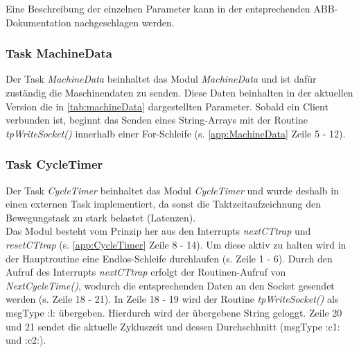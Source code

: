 Eine Beschreibung der einzelnen Parameter kann in der entsprechenden 
ABB-Dokumentation nachgeschlagen werden.



\subsubsection{Task MachineData}
Der Task \textit{MachineData} beinhaltet das Modul \textit{MachineData} und ist 
dafür zuständig die Maschinendaten zu senden. Diese Daten beinhalten in der 
aktuellen Version die in \ref{tab:machineData} dargestellten Parameter. Sobald 
ein Client verbunden ist, beginnt das Senden eines String-Arrays mit der 
Routine \textit{tpWriteSocket()} innerhalb einer For-Schleife (s. 
\ref{app:MachineData} Zeile 5 - 12).



\subsubsection{Task CycleTimer}
Der Task \textit{CycleTimer} beinhaltet das Modul \textit{CycleTimer} und wurde 
deshalb in einen externen Task implementiert, da sonst die Taktzeitaufzeichnung 
den Bewegungstask zu stark belastet (Latenzen).\\
Das Modul besteht vom Prinzip her aus den Interrupts \textit{nextCTtrap} und 
\textit{resetCTtrap} (s. \ref{app:CycleTimer} Zeile 8 - 14). Um diese aktiv zu 
halten wird in der Hauptroutine eine Endlos-Schleife durchlaufen (s. Zeile 1 - 
6). Durch den Aufruf des Interrupts \textit{nextCTtrap} erfolgt der 
Routinen-Aufruf von \textit{NextCycleTime()}, wodurch die entsprechenden Daten 
an den Socket gesendet werden (s. Zeile 18 - 21). In Zeile 18 - 19 wird der 
Routine \textit{tpWriteSocket()} als msgType :l: übergeben. Hierdurch wird der 
übergebene String geloggt. Zeile 20 und 21 sendet die aktuelle Zykluszeit und 
dessen Durchschhnitt (msgType :c1: und :c2:).

